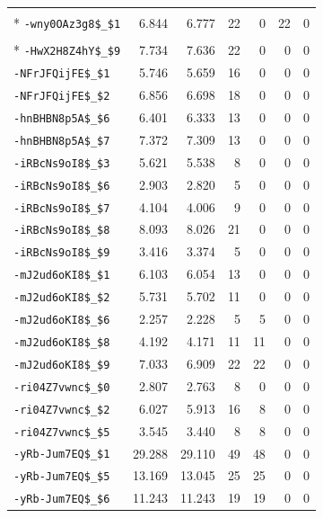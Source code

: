 \begin{longtable}{lrrrrrr}
\addlinespace[0.5em]
\multicolumn{7}{l}{\textbf{3. 全部词通过对齐筛选，但视觉模态不可观测（1条）}}\\*
\nolinkurl{-wny0OAz3g8$_$1} & 6.844 & 6.777 & 22 & 0 & 22 & 0\\
\addlinespace[0.5em]
\multicolumn{7}{l}{\textbf{4. 整段对齐受限（已完成人工审核）（21条）}}\\*
\nolinkurl{-HwX2H8Z4hY$_$9} & 7.734 & 7.636 & 22 & 0 & 0 & 0\\
\nolinkurl{-NFrJFQijFE$_$1} & 5.746 & 5.659 & 16 & 0 & 0 & 0\\
\nolinkurl{-NFrJFQijFE$_$2} & 6.856 & 6.698 & 18 & 0 & 0 & 0\\
\nolinkurl{-hnBHBN8p5A$_$6} & 6.401 & 6.333 & 13 & 0 & 0 & 0\\
\nolinkurl{-hnBHBN8p5A$_$7} & 7.372 & 7.309 & 13 & 0 & 0 & 0\\
\nolinkurl{-iRBcNs9oI8$_$3} & 5.621 & 5.538 & 8 & 0 & 0 & 0\\
\nolinkurl{-iRBcNs9oI8$_$6} & 2.903 & 2.820 & 5 & 0 & 0 & 0\\
\nolinkurl{-iRBcNs9oI8$_$7} & 4.104 & 4.006 & 9 & 0 & 0 & 0\\
\nolinkurl{-iRBcNs9oI8$_$8} & 8.093 & 8.026 & 21 & 0 & 0 & 0\\
\nolinkurl{-iRBcNs9oI8$_$9} & 3.416 & 3.374 & 5 & 0 & 0 & 0\\
\nolinkurl{-mJ2ud6oKI8$_$1} & 6.103 & 6.054 & 13 & 0 & 0 & 0\\
\nolinkurl{-mJ2ud6oKI8$_$2} & 5.731 & 5.702 & 11 & 0 & 0 & 0\\
\nolinkurl{-mJ2ud6oKI8$_$6} & 2.257 & 2.228 & 5 & 5 & 0 & 0\\
\nolinkurl{-mJ2ud6oKI8$_$8} & 4.192 & 4.171 & 11 & 11 & 0 & 0\\
\nolinkurl{-mJ2ud6oKI8$_$9} & 7.033 & 6.909 & 22 & 22 & 0 & 0\\
\nolinkurl{-ri04Z7vwnc$_$0} & 2.807 & 2.763 & 8 & 0 & 0 & 0\\
\nolinkurl{-ri04Z7vwnc$_$2} & 6.027 & 5.913 & 16 & 8 & 0 & 0\\
\nolinkurl{-ri04Z7vwnc$_$5} & 3.545 & 3.440 & 8 & 8 & 0 & 0\\
\nolinkurl{-yRb-Jum7EQ$_$1} & 29.288 & 29.110 & 49 & 48 & 0 & 0\\
\nolinkurl{-yRb-Jum7EQ$_$5} & 13.169 & 13.045 & 25 & 25 & 0 & 0\\
\nolinkurl{-yRb-Jum7EQ$_$6} & 11.243 & 11.243 & 19 & 19 & 0 & 0\\
\end{longtable}
\endgroup

